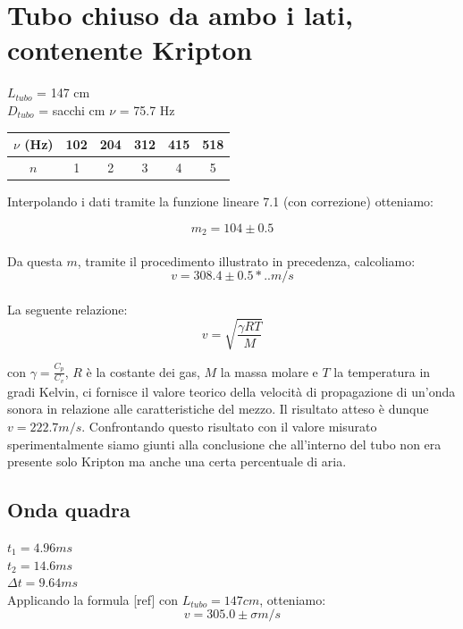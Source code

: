 \section{Tubo chiuso da ambo i lati, contenente Kripton}

$L_{tubo}$ = 147 cm\\
$D_{tubo}$ = sacchi cm
$\nu$ = 75.7 Hz
 


\begin{center}
\begin{tabular}{c|c|c|c|c|c}
$\nu$ (Hz) & 102 & 204 & 312 & 415 & 518 \\
\midrule
$n$ & 1 & 2 & 3 & 4 & 5\\
\end{tabular}
\end{center}

Interpolando i dati tramite la funzione lineare 7.1 (con correzione) otteniamo:

$$ m_2 = 104 \pm 0.5 $$ 
\\
Da questa $m$, tramite il procedimento illustrato in precedenza, calcoliamo: 
$$v = 308.4\pm0.5*..  m/s $$
\\
La seguente relazione:
$$v=\sqrt{\frac{\gamma RT}{M}}$$

con $\gamma = \frac{C_p}{C_v}$, $R$ è la costante dei gas, $M$ la massa molare e $T$ la temperatura in gradi Kelvin, ci fornisce il valore teorico della velocità di propagazione di un'onda sonora in relazione alle caratteristiche del mezzo. 
Il risultato atteso è dunque $v=222.7 m/s$. Confrontando questo risultato con il valore misurato sperimentalmente siamo giunti alla conclusione che all'interno del tubo non era presente solo Kripton ma anche una certa percentuale di aria.

\subsection{Onda quadra}
$t_1 = 4.96 ms $\\
$t_2 = 14.6 ms $\\
$\Delta t = 9.64 ms $ \\
Applicando la formula [ref] con $L_{tubo} = 147 cm$, otteniamo:
$$ v = 305.0 \pm \sigma m/s $$ 


